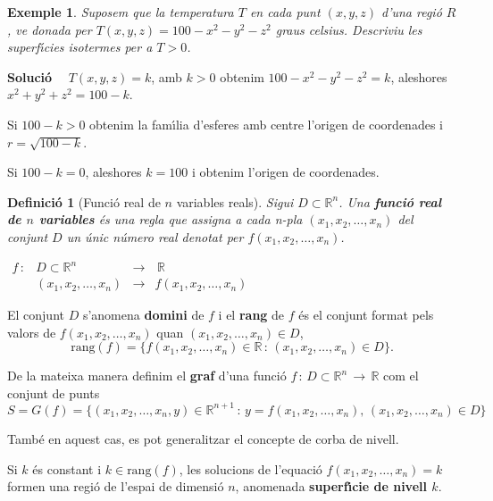 \documentclass[12pt]{article}
\newcommand{\solucio}{\textbf{Soluci{\'o}}\ \ }
\newtheorem{definicio}{Definici{\'o}}[subsection]
\newtheorem{exemple}{Exemple}[subsection]
\newcommand{\R}{\mathbb{R}}
\begin{document}
\vspace{0.4cm}
\begin{exemple}
Suposem que la temperatura $T$ en cada punt $(x,y,z)$
  d'una regi{\'o} $R$, ve donada per $T(x,y,z)=100-x^2-y^2-z^2$  graus celsius.
  Descriviu les superf{\'\i}cies isotermes per a $T > 0$.
\end{exemple}

\solucio
  $T(x,y,z)=k$, amb $k> 0$ obtenim $100-x^2-y^2-z^2 = k$,
  aleshores $x^2+y^2+z^2=100-k$.

  \noindent Si $100-k > 0$ obtenim la fam{\'\i}lia d'esferes amb
  centre l'origen de coordenades i $r=\sqrt{100-k}$.

  \noindent Si $100-k=0$, aleshores $k=100$ i obtenim l'origen de
  coordenades.

\vspace{0.4cm}
\begin{definicio}[Funci{\'o} real de $n$ variables reals]
Sigui $D\subset \R^n$. Una \textbf{funci{\'o} real de $n$ variables} {\'e}s una
regla que assigna a cada n-pla $(x_1,x_2,\ldots ,x_n)$ del conjunt
$D$ un {\'u}nic n{\'u}mero real denotat per $f(x_1,x_2,\ldots ,x_n)$.
\end{definicio}


\hspace{3cm}
$
\begin{array}{cccc}
f\, :& D\subset \R^n\, & \longrightarrow & \,\R \\
&(x_1,x_2,\ldots ,x_n) &\longrightarrow & f(x_1,x_2,\ldots ,x_n)
\end{array}
$

\vspace{0.2cm}
El conjunt $D$ s'anomena \textbf{domini} de $f$ i el \textbf{rang} de $f$ {\'e}s el
conjunt format pels valors de $f(x_1,x_2,\ldots ,x_n)$ quan
$(x_1,x_2,\ldots ,x_n)\in D$,
\[
\mbox{rang}(f)=\{f(x_1,x_2,\ldots ,x_n)\in\R\, :\, (x_1,x_2,\ldots
,x_n)\in D  \} .
\]

De la mateixa manera definim el \textbf{graf} d'una
funci{\'o} $f\, :\, D\subset \R^n\,  \longrightarrow \,\R$ com el
conjunt de punts
\[
S=G(f)=\{ (x_1,x_2,\ldots ,x_n,y)\in\R^{n+1}\, :\,
y=f(x_1,x_2,\ldots ,x_n),\, (x_1,x_2,\ldots ,x_n)\in D \}
\]

Tamb{\'e} en aquest cas, es pot generalitzar el concepte de corba de
nivell.

\noindent Si $k$ {\'e}s constant i $k\in\mbox{rang}(f)$, les
solucions de l'equaci{\'o} $f(x_1,x_2,\ldots ,x_n)=k$ formen una
regi{\'o} de l'espai de dimensi{\'o} $n$, anomenada \textbf{superf{\'\i}cie de
nivell $k$}.
\end{document}
